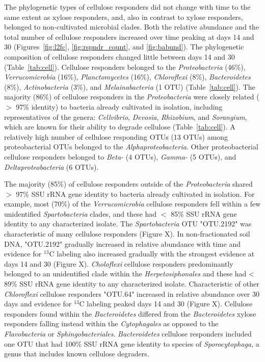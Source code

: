 The phylogenetic types of cellulose responders did not change with time to the
same extent as xylose responders, and, also in contrast to xylose responders,
belonged to non-cultivated microbial clades. Both the relative abundance and
the total number of cellulose responders increased over time peaking at days 14
and 30 (Figures~\ref{fig:l2fc}, \ref{fig:rspndr_count}, and \ref{fig:babund}). The phylogenetic composition of cellulose
responders changed little between days 14 and 30 (Table~\ref{tab:cell}). Cellulose
responders belonged to the \textit{Proteobacteria} (46\%),
\textit{Verrucomicrobia} (16\%), \textit{Planctomycetes} (16\%),
\textit{Chloroflexi} (8\%), \textit{Bacteroidetes} (8\%),
\textit{Actinobacteria} (3\%), and \textit{Melainabacteria} (1 OTU) (Table~\ref{tab:cell}).
The majority (86\%) of cellulose responders in the \textit{Proteobacteria}
were closely related ($>$ 97\% identity) to bacteria already cultivated in
isolation, including representatives of the genera: \textit{Cellvibrio},
\textit{Devosia}, \textit{Rhizobium}, and \textit{Sorangium}, which are
known for their ability to degrade cellulose (Table~\ref{tab:cell}).
A relatively high number of cellulose responding OTUs (13 OTUs) among
proteobacterial OTUs belonged to the \textit{Alphaproteobacteria}. Other
proteobacterial cellulose responders belonged to \textit{Beta-} (4 OTUs),
\textit{Gamma-} (5 OTUs), and \textit{Deltaproteobacteria} (6 OTUs). 

The majority (85\%) of cellulose responders outside of the
\textit{Proteobacteria} shared  $>$ 97\% SSU rRNA gene identity to bacteria
already cultivated in isolation. For example, most (70\%) of the
\textit{Verrucomicrobia} cellulose responders fell within a few unidentified
\textit{Spartobacteria} clades, and these had $<$ 85\% SSU rRNA gene identity
to any characterized isolate. The \textit{Spartobacteria} OTU "OTU.2192" was
characteristic of many cellulose responders (Figure X). In non-fractionated
soil DNA, "OTU.2192" gradually increased in relative abundance with time and
evidence for $^{13}$C labeling also increased gradually with the strongest evidence
at days 14 and 30 (Figure X). \textit{Choloflexi} cellulose responders
predominantly belonged to an unidentified clade within the
\textit{Herpetosiphonales} and these had < 89\% SSU rRNA gene identity to any
characterized isolate. Characteristic of other \textit{Chloroflexi} cellulose
responders "OTU.64" increased in relative abundance over 30 days and evidence
for $^{13}$C labeling peaked days 14 and 30 (Figure X). Cellulose responders found
within the \textit{Bacteroidetes} differed from the \textit{Bacteroidetes}
xylose responders falling instead within the \textit{Cytophagales} as opposed
to the \textit{Flavobacteria} or \textit{Sphingobacteriales}.
\textit{Bacteroidetes} cellulose responders included one OTU that had 100\% SSU
rRNA gene identity to species of \textit{Sporocytophaga}, a genus that includes
known cellulose degraders.

